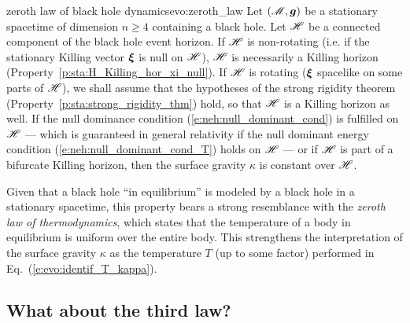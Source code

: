 \begin{tprop}{zeroth law of black hole dynamics}{evo:zeroth_law}
Let $(\mathscr{M},\bm{g})$ be a stationary spacetime of dimension $n\geq 4$
containing a black hole.
Let $\mathscr{H}$ be a connected component of the black hole event horizon.
If $\mathscr{H}$ is non-rotating (i.e. if the stationary Killing vector $\bm{\xi}$ is null
on $\mathscr{H}$), $\mathscr{H}$ is necessarily a Killing horizon (Property~\ref{p:sta:H_Killing_hor_xi_null}).
If $\mathscr{H}$ is rotating
($\bm{\xi}$ spacelike on some parts of $\mathscr{H}$),
we shall assume that the hypotheses of the strong rigidity theorem
(Property~\ref{p:sta:strong_rigidity_thm}) hold, so that $\mathscr{H}$ is a Killing horizon as well.
If the null dominance condition (\ref{e:neh:null_dominant_cond})
is fulfilled on $\mathscr{H}$  --- which is guaranteed in general relativity
if the null dominant energy condition (\ref{e:neh:null_dominant_cond_T}) holds on $\mathscr{H}$ ---
or if $\mathscr{H}$ is part of a bifurcate Killing horizon,
then the surface gravity $\kappa$ is constant over $\mathscr{H}$.
\end{tprop}

Given that a black hole ``in equilibrium'' is modeled by a black hole in
a stationary spacetime,
this property bears a strong resemblance with
the \emph{zeroth law of thermodynamics}, which states that the temperature of a body in equilibrium
is uniform over the entire body.
This strengthens the interpretation of the surface gravity
$\kappa$ as the temperature $T$ (up to some factor) performed in
Eq.~(\ref{e:evo:identif_T_kappa}).


\subsection{What about the third law?} \label{s:evo:third_law}

